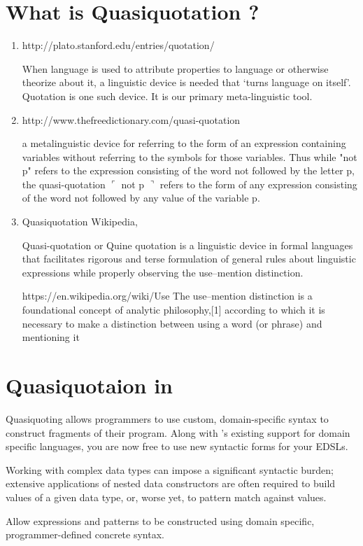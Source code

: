 \documentclass[thesis-solanki.tex]{subfiles}
\begin{document}
\section{What is Quasiquotation ?}
\begin{enumerate}
\item http://plato.stanford.edu/entries/quotation/

When language is used to attribute properties to language or otherwise theorize about it, a linguistic device is needed that ‘turns 
language on itself’. Quotation is one such device. It is our primary meta-linguistic tool.

\item http://www.thefreedictionary.com/quasi-quotation

a metalinguistic device for referring to the form of an expression containing variables without referring to the symbols for those 
variables. Thus while "not p" refers to the expression consisting of the word not followed by the letter p, the quasi-quotation \newline
$\ulcorner$ not p $\urcorner$ refers to the form of any expression consisting of the word not followed by any value of the variable p.

\item  Quasiquotation Wikipedia, \cite{wikiquasi}

Quasi-quotation or Quine quotation is a linguistic device in formal languages that facilitates rigorous and terse formulation of general rules about linguistic expressions while properly observing the use–mention distinction.

https://en.wikipedia.org/wiki/Use%
The use–mention distinction is a foundational concept of analytic philosophy,[1] according to which it is necessary to make a distinction 
between using a word (or phrase) and mentioning it


\end{enumerate}

\section{Quasiquotaion in }
\cite{haskellquasi, mainland2007s} 

Quasiquoting allows programmers to use custom, domain-specific syntax to construct fragments of their program. Along with 
's existing support for domain specific languages, you are now free to use new syntactic forms for your EDSLs. 

Working with complex data types can impose a significant syntactic burden; extensive applications of nested data constructors are often 
required to build values of a given data type, or, worse yet, to pattern match against values.

Allow  expressions and patterns to be constructed using domain specific, programmer-defined concrete syntax.
\end{document}
